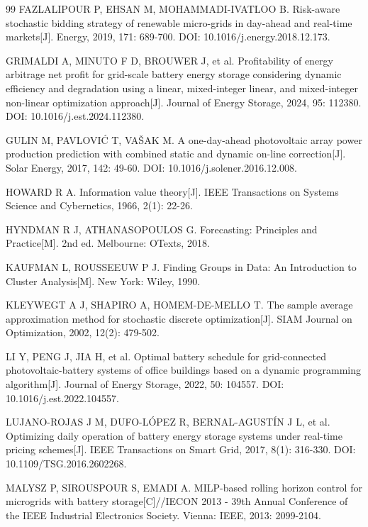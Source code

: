 \documentclass[withoutpreface,bwprint]{cumcmthesis}
\begin{document}
{\begin{thebibliography}{99}
 FAZLALIPOUR P, EHSAN M, MOHAMMADI-IVATLOO B. Risk-aware stochastic bidding strategy of renewable micro-grids in day-ahead and real-time markets[J]. Energy, 2019, 171: 689-700. DOI: 10.1016/j.energy.2018.12.173.

 GRIMALDI A, MINUTO F D, BROUWER J, et al. Profitability of energy arbitrage net profit for grid-scale battery energy storage considering dynamic efficiency and degradation using a linear, mixed-integer linear, and mixed-integer non-linear optimization approach[J]. Journal of Energy Storage, 2024, 95: 112380. DOI: 10.1016/j.est.2024.112380.

 GULIN M, PAVLOVIĆ T, VAŠAK M. A one-day-ahead photovoltaic array power production prediction with combined static and dynamic on-line correction[J]. Solar Energy, 2017, 142: 49-60. DOI: 10.1016/j.solener.2016.12.008.

 HOWARD R A. Information value theory[J]. IEEE Transactions on Systems Science and Cybernetics, 1966, 2(1): 22-26.

 HYNDMAN R J, ATHANASOPOULOS G. Forecasting: Principles and Practice[M]. 2nd ed. Melbourne: OTexts, 2018.

 KAUFMAN L, ROUSSEEUW P J. Finding Groups in Data: An Introduction to Cluster Analysis[M]. New York: Wiley, 1990.

 KLEYWEGT A J, SHAPIRO A, HOMEM-DE-MELLO T. The sample average approximation method for stochastic discrete optimization[J]. SIAM Journal on Optimization, 2002, 12(2): 479-502.

 LI Y, PENG J, JIA H, et al. Optimal battery schedule for grid-connected photovoltaic-battery systems of office buildings based on a dynamic programming algorithm[J]. Journal of Energy Storage, 2022, 50: 104557. DOI: 10.1016/j.est.2022.104557.

 LUJANO-ROJAS J M, DUFO-LÓPEZ R, BERNAL-AGUSTÍN J L, et al. Optimizing daily operation of battery energy storage systems under real-time pricing schemes[J]. IEEE Transactions on Smart Grid, 2017, 8(1): 316-330. DOI: 10.1109/TSG.2016.2602268.

 MALYSZ P, SIROUSPOUR S, EMADI A. MILP-based rolling horizon control for microgrids with battery storage[C]//IECON 2013 - 39th Annual Conference of the IEEE Industrial Electronics Society. Vienna: IEEE, 2013: 2099-2104.


\end{thebibliography}}
\end{document}
